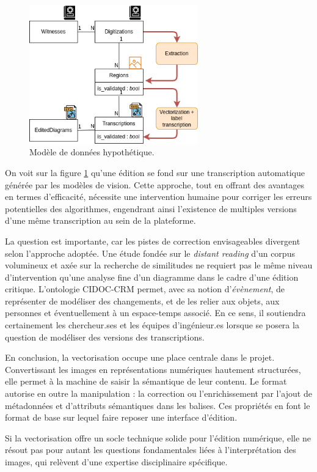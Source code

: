  \begin{figure}[H]
          \begin{center}
          \includegraphics[height=6cm]{figues/modele_edition.png}
          \end{center}
          \caption{Modèle de données hypothétique.}
          \label{fig:modele_edition} \end{figure}

On voit sur la figure \ref{fig:modele_edition} qu'une édition se fond sur une transcription
automatique générée par les modèles de vision. Cette approche, tout en
offrant des avantages en termes d'efficacité, nécessite une intervention
humaine pour corriger les erreurs potentielles des algorithmes,
engendrant ainsi l'existence de multiples versions d'une même
transcription au sein de la plateforme.

La question est importante, car les pistes de correction envisageables divergent selon l'approche adoptée. Une étude fondée sur le \textit{distant reading} d'un corpus volumineux et axée sur la recherche de similitudes ne requiert pas le même niveau d'intervention qu'une analyse fine d'un diagramme dans le cadre d'une édition critique. L'ontologie CIDOC-CRM permet, avec sa notion d'\textit{évènement}, de représenter de modéliser des changements, et de les relier aux objets, aux personnes et éventuellement à un espace-temps associé. En ce sens, il soutiendra certainement les chercheur.ses et les équipes d'ingénieur.es lorsque se posera la question de modéliser des versions des transcriptions.  

En conclusion, la vectorisation occupe une place centrale dans le
projet. Convertissant les images en représentations numériques hautement
structurées, elle permet à la machine de saisir la sémantique de leur
contenu. Le format \svg autorise en outre la manipulation : la correction
ou l'enrichissement par l'ajout de métadonnées et d'attributs
sémantiques dans les balises. Ces propriétés en font le format de base
sur lequel faire reposer une interface d'édition.

Si la vectorisation offre un socle technique solide pour l'édition
numérique, elle ne résout pas pour autant les questions fondamentales
liées à l'interprétation des images, qui relèvent d'une expertise
disciplinaire spécifique.